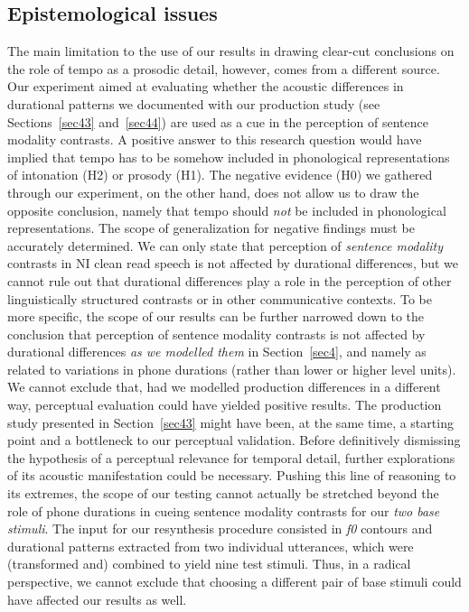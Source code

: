 \subsection{Epistemological issues}\label{sec542}
The main limitation to the use of our results in drawing clear-cut conclusions on the role of tempo as a prosodic detail, however, comes from a different source. Our experiment aimed at evaluating whether the acoustic differences in durational patterns we documented with our production study (see Sections~\ref{sec43} and~\ref{sec44}) are used as a cue in the perception of sentence modality contrasts. A positive answer to this research question would have implied that tempo has to be somehow included in phonological representations of intonation (H2) or prosody (H1). The negative evidence (H0) we gathered through our experiment, on the other hand, does not allow us to draw the opposite conclusion, namely that tempo should \textit{not} be included in phonological representations. The scope of generalization for negative findings must be accurately determined. We can only state that perception of \textit{sentence modality} contrasts in NI clean read speech is not affected by durational differences, but we cannot rule out that durational differences play a role in the perception of other linguistically structured contrasts or in other communicative contexts.
To be more specific, the scope of our results can be further narrowed down to the conclusion that perception of sentence modality contrasts is not affected by durational differences \textit{as we modelled them} in Section~\ref{sec4}, and namely as related to variations in phone durations (rather than lower or higher level units). We cannot exclude that, had we modelled production differences in a different way, perceptual evaluation could have yielded positive results. The production study presented in Section~\ref{sec43} might have been, at the same time, a starting point and a bottleneck to our perceptual validation. Before definitively dismissing the hypothesis of a perceptual relevance for temporal detail, further explorations of its acoustic manifestation could be necessary.
Pushing this line of reasoning to its extremes, the scope of our testing cannot actually be stretched beyond the role of phone durations in cueing sentence modality contrasts for our \textit{two base stimuli}. The input for our resynthesis procedure consisted in \textit{f0} contours and durational patterns extracted from two individual utterances, which were (transformed and) combined to yield nine test stimuli. Thus, in a radical perspective, we cannot exclude that choosing a different pair of base stimuli could have affected our results as well.
